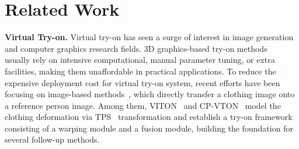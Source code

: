 \documentclass[sigconf]{acmart}
\begin{document}
\section{Related Work}
\textbf{Virtual Try-on.}
Virtual try-on has seen a surge of interest in image generation and computer graphics research fields. 
3D graphics-based try-on methods~\cite{robert2002animation,r2003clothsimulation,selle2009hrcloth,peng2012drape,fabian2014scs,stoll2010video,gerard2017clothcap,lahner2018deepwrinkles,bhatnagar2019mgn} 
usually rely on intensive computational, manual parameter tuning, or extra facilities, making them unaffordable in practical applications.
To reduce the expensive deployment cost for virtual try-on system, recent efforts have been focusing on image-based methods~\cite{xintong2018viton,bochao2018cpvton,yun2019vtnfp,xintong2019clothflow,Matiur2020cpvton+,han2020acgpn,fancato2020viton-gt,thibaut2020swuton,neuberger2020oviton,dong2019mgvton}, which directly transfer a clothing image onto a reference person image.
Among them, VITON~\cite{xintong2018viton} and CP-VTON~\cite{bochao2018cpvton} model the clothing deformation via TPS~\cite{bookstein1989TPS} transformation and establish a try-on framework consisting of a warping module and a fusion module, building the foundation for several follow-up methods.
\end{document}

